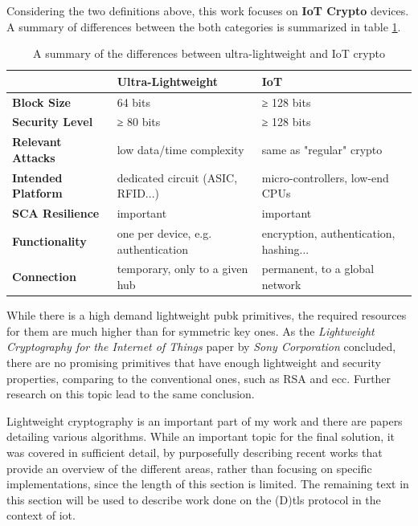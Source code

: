 \documentclass{llncs}
\begin{document}
Considering the two definitions above, this work focuses on \textbf{IoT Crypto}
devices. A summary of differences between the both categories is summarized in
table \ref{ul-iot}.

\begin{table}[]
\centering
\caption{A summary of the differences between ultra-lightweight and IoT crypto}
\label{ul-iot}
\begin{tabular}{@{}lll@{}}
\toprule
                           & \textbf{Ultra-Lightweight}          & \textbf{IoT}                           \\ \midrule
\textbf{Block Size}        & 64 bits                             & ≥ 128 bits                             \\
\textbf{Security Level}    & ≥ 80 bits                           & ≥ 128 bits                             \\
\textbf{Relevant Attacks}  & low data/time complexity            & same as "regular" crypto               \\
\textbf{Intended Platform} & dedicated circuit (ASIC, RFID...)   & micro-controllers, low-end CPUs        \\
\textbf{SCA Resilience}    & important                           & important                              \\
\textbf{Functionality}     & one per device, e.g. authentication & encryption, authentication, hashing... \\
\textbf{Connection}        & temporary, only to a given hub      & permanent, to a global network         \\ \bottomrule
\end{tabular}
\end{table}

While there is a high demand lightweight \gls{pubk} primitives, the required
resources for them are much higher than for symmetric key ones. As the
\textit{Lightweight Cryptography for the Internet of Things}\cite{b5b8db9716:online} paper
by \textit{Sony Corporation} concluded, there are no promising primitives
that have enough lightweight and security properties, comparing to the
conventional ones, such as RSA and \gls{ecc}. Further research on this topic lead to the same conclusion.

Lightweight cryptography is an important part of my work and there are papers detailing
various algorithms. While an important topic for the final solution, it was covered in sufficient detail, by purposefully describing recent works that
provide an overview of the different areas, rather than focusing on specific
implementations, since the length of this section is limited. The remaining text
in this section will be used to describe work done on the (D)\gls{tls} protocol in the
context of \gls{iot}.
\end{document}
